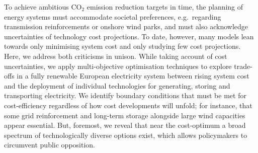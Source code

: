 
To achieve ambitious CO$_2$ emission reduction targets in time, the planning of
energy systems must accommodate societal preferences, e.g.~regarding
transmission reinforcements or onshore wind parks, and must also acknowledge
uncertainties of technology cost projections. To date, however, many models lean
towards only minimising system cost and only studying few cost projections.
Here, we address both criticisms in unison. While taking account of cost
uncertainties, we apply multi-objective optimisation techniques to explore
trade-offs in a fully renewable European electricity system between rising
system cost and the deployment of individual technologies for generating,
storing and transporting electricity. We identify boundary conditions that must
be met for cost-efficiency regardless of how cost developments will unfold; for
instance, that some grid reinforcement and long-term storage alongside large
wind capacities appear essential. But, foremost, we reveal that near the
cost-optimum a broad spectrum of technologically diverse options exist, which
allows policymakers to circumvent public opposition.

